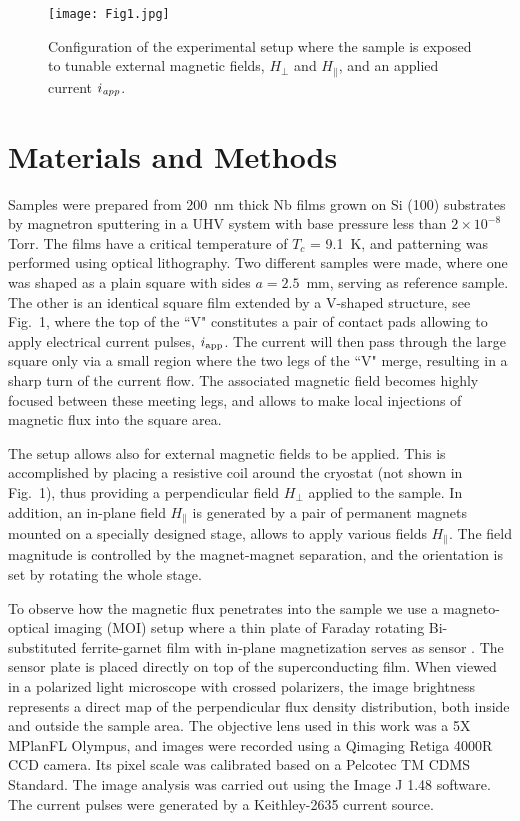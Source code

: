 \documentclass[superscriptaddress,twocolumn,aps,
showpacs]{revtex4-1}
\begin{document}
\begin{figure}[b]
  \centering
  \texttt{[image: Fig1.jpg]}
   \label{fig:drawing}
  \caption{Configuration of the experimental setup where the sample is exposed to tunable external magnetic fields, $H_{\perp}$ and $H_{\parallel}$, 
and an applied current  $i_{\rm \textit{app}}$.}
\end{figure}


\section{Materials and Methods}
Samples were prepared from 200~nm thick Nb films grown on Si (100) substrates by magnetron sputtering in a UHV system with base pressure less than $2 \times 10^{-8}$ Torr. 
The films have a critical temperature of $T_c$ = 9.1~K, and patterning was performed using optical lithography.
Two different samples were made, where one was shaped as a plain square with sides $a =2.5$~mm, serving as reference sample.
The other is an identical square film extended by a V-shaped structure, see Fig.~1, where the top of the ``V" constitutes a pair of contact pads allowing to apply electrical current pulses, $i_{\rm app}$. 
The current will then pass through the large square only via a small region where the two legs of the ``V" merge, resulting in a sharp turn of the current flow.
The associated magnetic field becomes highly focused between these meeting legs, and allows to make local injections of  magnetic flux into the square area.\cite{carmo_controllable_2016}

The setup allows also for external magnetic fields to be applied.
This is accomplished by placing a resistive coil around the cryostat (not shown in Fig.~1), thus providing a perpendicular field $H_{\perp}$ applied to the sample.
In addition, an in-plane field $H_{\parallel}$ is generated by a pair of permanent magnets mounted on a specially designed stage, allows to apply various fields $H_{\parallel}$.
The field magnitude is controlled by  the magnet-magnet separation, and the orientation  is set by rotating the whole stage.

To observe how the magnetic flux penetrates into the sample we use a magneto-optical imaging (MOI) setup where a thin plate of Faraday rotating Bi-substituted ferrite-garnet film with in-plane magnetization serves as sensor \cite{helseth_faraday_2001}.
The sensor plate is placed directly on top of the superconducting film. 
When viewed in a polarized light microscope with crossed polarizers, the  image brightness represents a direct map of the perpendicular flux density 
distribution,\cite{johansen_direct_1996, vlasko-vlasov_magneto-optical_1999, jooss_magneto-optical_2002} both inside and outside the sample area.
The objective lens used in this work was a 5X MPlanFL Olympus, and images were recorded using a Qimaging Retiga 4000R CCD camera. 
Its pixel scale was calibrated based on a Pelcotec TM CDMS Standard.
The image analysis was carried out using the Image J 1.48 software.
The current pulses were generated by a Keithley-2635 current source.
\end{document}

